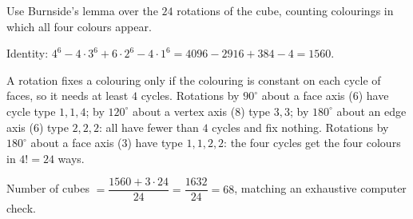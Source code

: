 Use Burnside's lemma over the $24$ rotations of the cube, counting colourings in which all four colours appear.

Identity: $4^6-4\cdot3^6+6\cdot2^6-4\cdot1^6=4096-2916+384-4=1560$.

A rotation fixes a colouring only if the colouring is constant on each cycle of faces, so it needs at least $4$ cycles. Rotations by $90^\circ$ about a face axis ($6$) have cycle type $1,1,4$; by $120^\circ$ about a vertex axis ($8$) type $3,3$; by $180^\circ$ about an edge axis ($6$) type $2,2,2$: all have fewer than $4$ cycles and fix nothing. Rotations by $180^\circ$ about a face axis ($3$) have type $1,1,2,2$: the four cycles get the four colours in $4!=24$ ways.

Number of cubes $=\dfrac{1560+3\cdot24}{24}=\dfrac{1632}{24}=\boxed{68}$, matching an exhaustive computer check.
